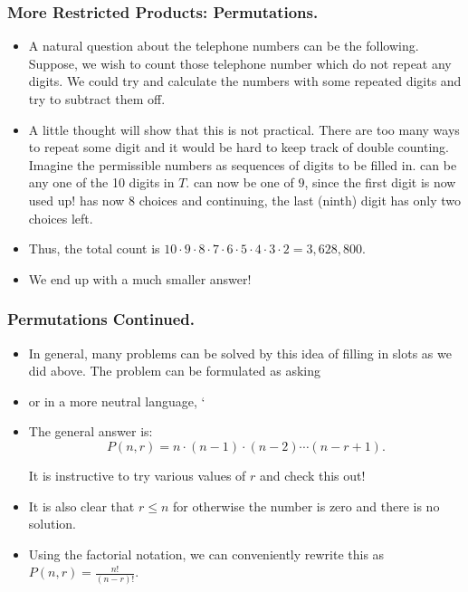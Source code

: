 %


\begin{frame}%
  \frametitle{More Restricted Products: Permutations.}
  \begin{itemize}%
 
\item A natural question about the telephone numbers can be the
following. Suppose, we wish to count those telephone number which do not
repeat any digits. We could try and calculate the numbers with some
repeated digits and try to subtract them off.

\item A little thought will show that this is not practical. There are
too many ways to repeat some digit and it would be hard to keep track of
double counting.
Imagine the permissible numbers as sequences of digits to be filled in.
 can be any one of the 10 digits in $T$.
 can now be one of $9$, since the first digit is now used up!
 has now $8$ choices and continuing, the last (ninth)
digit has only two choices left.
\item Thus, the total count is $10\cdot 9 \cdot 8 \cdot 7\cdot 6 \cdot
5\cdot 4 \cdot 3 \cdot 2 = 3,628,800$.

\item We end up with a much smaller answer!
\end{itemize}
\end{frame}

%



\begin{frame}%
  \frametitle{Permutations Continued.}
  \begin{itemize}%

\item
In general, many problems can be solved by this idea of filling in slots
as we did above. The problem can be formulated as asking

\item
{}
or in a more neutral language, `

\item The general answer is:
$$P(n,r) = n \cdot (n-1) \cdot (n-2) \cdots (n-r+1) .$$

It is instructive to try various values of $r$ and check this out!

\item It is also clear that $r\leq n$ for otherwise the number is zero
and there is no solution. 

\item Using the factorial notation, we can conveniently rewrite this as
$P(n,r) = \frac{n!}{(n-r)!}$.



\end{itemize}
\end{frame}

